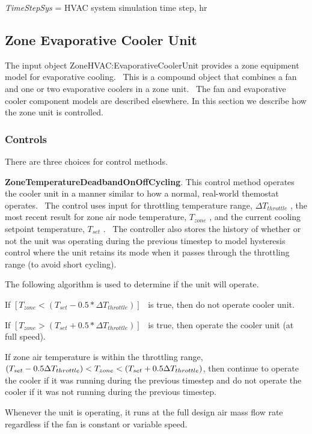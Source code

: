 \emph{TimeStepSys} = HVAC system simulation time step, hr

\subsection{Zone Evaporative Cooler Unit}\label{zone-evaporative-cooler-unit}

The input object ZoneHVAC:EvaporativeCoolerUnit provides a zone equipment model for evaporative cooling.~ This is a compound object that combines a fan and one or two evaporative coolers in a zone unit.~ The fan and evaporative cooler component models are described elsewhere. In this section we describe how the zone unit is controlled.

\subsubsection{Controls}\label{controls-000}

There are three choices for control methods.

\textbf{ZoneTemperatureDeadbandOnOffCycling}. This control method operates the cooler unit in a manner similar to how a normal, real-world themostat operates.~ The control uses input for throttling temperature range, \(\Delta {T_{throttle}}\) , the most recent result for zone air node temperature, \({T_{zone}}\) , and the current cooling setpoint temperature, \({T_{set}}\) .~ The controller also stores the history of whether or not the unit was operating during the previous timestep to model hysteresis control where the unit retains its mode when it passes through the throttling range (to avoid short cycling).

The following algorithm is used to determine if the unit will operate.

If \(\left[ {{T_{zone}} < \left( {{T_{set}} - 0.5*\Delta {T_{throttle}}} \right)} \right]\) ~is true, then do not operate cooler unit.

If \(\left[ {{T_{zone}} > \left( {{T_{set}} + 0.5*\Delta {T_{throttle}}} \right)} \right]\) ~is true, then operate the cooler unit (at full speed).

If zone air temperature is within the throttling range, $\PB{T_{set}-0.5\Delta T_{throttle}} < T_{zone} < \PB{T_{set}+0.5\Delta T_{throttle}}$, then continue to operate the cooler if it was running during the previous timestep and do not operate the cooler if it was not running during the previous timestep.

Whenever the unit is operating, it runs at the full design air mass flow rate regardless if the fan is constant or variable speed.

